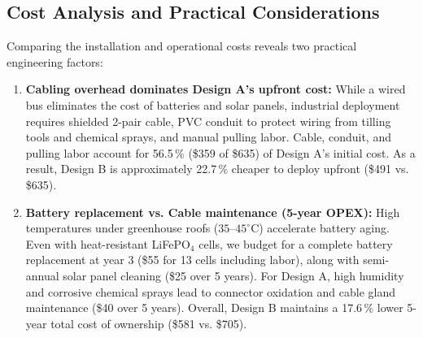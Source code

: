 \documentclass[11pt,a4paper]{report}
\begin{document}
\subsection{Cost Analysis and Practical Considerations}
Comparing the installation and operational costs reveals two practical engineering factors:
\begin{enumerate}
  \item \textbf{Cabling overhead dominates Design A's upfront cost:} While a wired bus eliminates the cost of batteries and solar panels, industrial deployment requires shielded 2-pair cable, PVC conduit to protect wiring from tilling tools and chemical sprays, and manual pulling labor. Cable, conduit, and pulling labor account for 56.5\,\% (\$359 of \$635) of Design A's initial cost. As a result, Design B is approximately 22.7\,\% cheaper to deploy upfront (\$491 vs. \$635).
  \item \textbf{Battery replacement vs. Cable maintenance (5-year OPEX):} High temperatures under greenhouse roofs ($35$--$45^\circ\text{C}$) accelerate battery aging. Even with heat-resistant LiFePO$_4$ cells, we budget for a complete battery replacement at year 3 (\$55 for 13 cells including labor), along with semi-annual solar panel cleaning (\$25 over 5 years). For Design A, high humidity and corrosive chemical sprays lead to connector oxidation and cable gland maintenance (\$40 over 5 years). Overall, Design B maintains a 17.6\,\% lower 5-year total cost of ownership (\$581 vs. \$705).
\end{enumerate}
\end{document}

